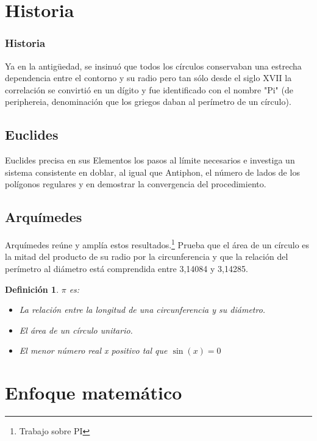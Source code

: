 \documentclass{beamer}
\newtheorem{definicion}{Definición}
\begin{document}
\section{Historia}
\begin{frame}

\frametitle{Historia}

Ya en la antigüedad, se insinuó que todos los círculos conservaban una estrecha dependencia entre el contorno y su radio pero tan sólo desde el
siglo XVII la correlación se convirtió en un dígito\cite{gibaldMLA:2009} y fue identificado con el nombre "Pi" (de periphereia, denominación que los griegos daban
al perímetro de un círculo).

\subsection{Euclides}
Euclides precisa en sus Elementos los pasos al límite necesarios e investiga un sistema consistente en doblar, al igual que Antiphon, el número de
lados de los polígonos regulares y en demostrar la convergencia del procedimiento.

\subsection{Arquímedes}
Arquímedes reúne y amplía estos resultados.\footnote{Trabajo sobre PI} Prueba que el área de un círculo es la mitad del producto de su radio por la circunferencia y que la
relación del perímetro al diámetro está comprendida entre 3,14084 y 3,14285.

\begin{definicion}
$\pi$ es:

\begin{itemize}
\item La relación entre la longitud de una circunferencia y su diámetro.
\item El área de un círculo\cite{plan} unitario.
\item El menor número real x positivo tal que $\sin(x) = 0$
\end{itemize}

\end{definicion}
\end{frame}


\section{Enfoque matemático}
\end{document}
